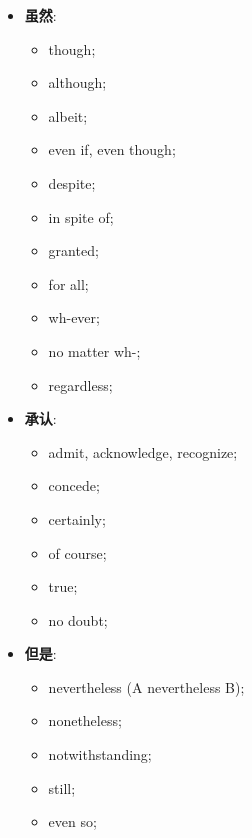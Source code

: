   \begin{multicols}{3}
    \begin{itemize}
      \item \textbf{虽然}:
      \begin{itemize}
        \item though;
        \item although;
        \item albeit;
        \item even if, even though;
        \item despite;
        \item in spite of;
        \item granted;
        \item for all;
        \item wh-ever;
        \item no matter wh-;
        \item regardless;
      \end{itemize}

      \item \textbf{承认}:
      \begin{itemize}
        \item admit, acknowledge, recognize;
        \item concede;
        \item certainly;
        \item of course;
        \item true;
        \item no doubt;
      \end{itemize}

      \item \textbf{但是}:
      \begin{itemize}
        \item nevertheless (A nevertheless B);
        \item nonetheless;
        \item notwithstanding;
        \item still;
        \item even so;
      \end{itemize}
    \end{itemize}
  \end{multicols}
